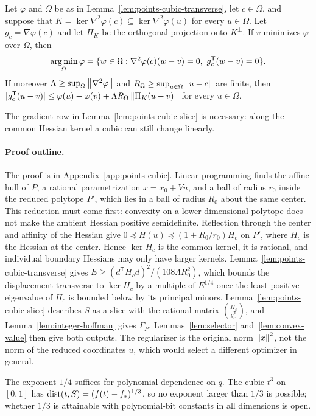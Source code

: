 \begin{lemma}\label{lem:points-cubic-slice}
Let $\varphi$ and $\Omega$ be as in Lemma~\ref{lem:points-cubic-transverse},
let $c\in\Omega$, and suppose that
$K=\ker\nabla^2\varphi(c)\subseteq\ker\nabla^2\varphi(u)$ for every
$u\in\Omega$. Let $g_c=\nabla\varphi(c)$ and let $\Pi_K$ be the orthogonal
projection onto $K^\perp$. If $v$ minimizes $\varphi$ over $\Omega$, then
\[
 \operatorname*{arg\,min}_\Omega\varphi=\{w\in\Omega:\nabla^2\varphi(c)(w-v)=0,\
 g_c^{\mathsf T}(w-v)=0\}.
\]
If moreover $\Lambda\ge\sup_\Omega\left\lVert\nabla^2\varphi\right\rVert$ and
$R_\Omega\ge\sup_{u\in\Omega}\left\lVert u-c\right\rVert$ are finite, then
$|g_c^{\mathsf T}(u-v)|\le\varphi(u)-\varphi(v)+\Lambda
R_\Omega\left\lVert\Pi_K(u-v)\right\rVert$ for every $u\in\Omega$.
\end{lemma}

The gradient row in Lemma~\ref{lem:points-cubic-slice} is necessary: along
the common Hessian kernel a cubic can still change linearly.

\paragraph{Proof outline.}
The proof is in Appendix~\ref{app:points-cubic}. Linear programming finds
the affine hull of $P$, a rational parametrization $x=x_0+Vu$, and a ball of
radius $r_0$ inside the reduced polytope $P'$, which lies in a ball of
radius $R_0$ about the same center. This reduction must come first:
convexity on a lower-dimensional polytope does not make the ambient Hessian
positive semidefinite. Reflection through the center and affinity of the
Hessian give $0\preceq H(u)\preceq(1+R_0/r_0)H_c$ on $P'$, where $H_c$ is the
Hessian at the center. Hence $\ker H_c$ is the common kernel, it is rational,
and individual boundary Hessians may only have larger kernels.
Lemma~\ref{lem:points-cubic-transverse} gives
$E\ge(d^{\mathsf T}H_cd)^2/(108\Lambda R_0^2)$, which bounds the displacement
transverse to $\ker H_c$ by a multiple of $E^{1/4}$ once the least positive
eigenvalue of $H_c$ is bounded below by its principal minors.
Lemma~\ref{lem:points-cubic-slice} describes $S$ as a slice with the rational
matrix $\binom{H_c}{g_c^{\mathsf T}}$, and Lemma~\ref{lem:integer-hoffman}
gives $\Gamma_P$. Lemmas~\ref{lem:selector} and~\ref{lem:convex-value} then
give both outputs. The regularizer is the original norm $\left\lVert x\right\rVert^2$, not the
norm of the reduced coordinates $u$, which would select a different optimizer
in general.

The exponent $1/4$ suffices for polynomial dependence on $q$. The cubic
$t^3$ on $[0,1]$ has $\operatorname{dist}(t,S)=(f(t)-f_*)^{1/3}$, so no exponent larger than
$1/3$ is possible; whether $1/3$ is attainable with polynomial-bit constants
in all dimensions is open.


